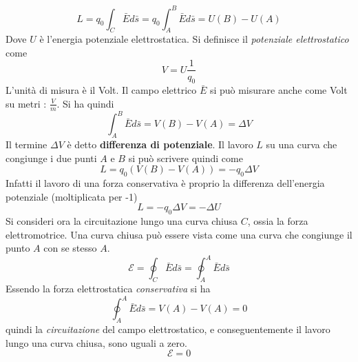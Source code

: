 \documentclass[10pt, letterpaper]{report}
\begin{document}
$$ L=q_0\int_C \bar E d\bar s= q_0\int_A^B \bar E d\bar s=U(B)-U(A)$$
Dove $U$ è l'energia potenziale elettrostatica. Si definisce il \textit{potenziale elettrostatico} come 
$$ V=U\frac{1}{q_0}$$
L'unità di misura è il Volt. Il campo elettrico $\bar E$ si può misurare anche come Volt su metri : $\frac{V}{m}$. Si ha quindi 
$$\int_A^B \bar E d\bar s=V(B)-V(A)=\Delta V$$
Il termine $\Delta V$ è detto \textbf{differenza di potenziale}. Il lavoro $L$ su una curva che congiunge i due punti $A$ e $B$ si può scrivere quindi come 
$$ L=q_0(V(B)-V(A))=-q_0\Delta V$$
Infatti  il lavoro di una forza conservativa è proprio la differenza dell'energia potenziale (moltiplicata per -1)
$$ L=-q_0\Delta V=-\Delta U$$
Si consideri ora la circuitazione lungo una curva chiusa $C$, ossia la forza elettromotrice. Una curva chiusa può essere vista come una curva che congiunge il punto $A$ con se stesso $A$. 
$$ \mathscr{E}=\oint_C \bar E d\bar s = \oint_A^A \bar E d\bar s$$
Essendo la forza elettrostatica \textit{conservativa} si ha 
$$\oint_A^A \bar E d\bar s = V(A)-V(A)=0 $$
quindi la \textit{circuitazione} del campo elettrostatico, e conseguentemente il lavoro lungo una curva chiusa, sono uguali a zero. 
$$\mathscr{E}=0 $$
\end{document}
